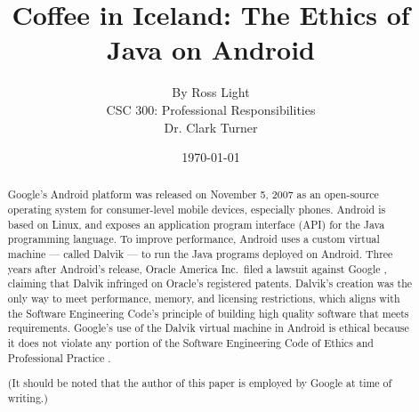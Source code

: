 \documentclass[11pt]{article}
\begin{document}
\title{\vfill Coffee in Iceland: The Ethics of Java on Android} %
\author{
By Ross Light \vspace{10pt} \\
CSC 300: Professional Responsibilities  \vspace{10pt} \\
Dr. Clark Turner \vspace{10pt} \\
}
\date{\today} %

\maketitle

\vfill  %
\begin{abstract} %

Google's Android platform was released on November 5, 2007
\cite{open-handset-alliance-ann} as an open-source operating system for
consumer-level mobile devices, especially phones.  Android is based on Linux,
and exposes an application program interface (API) for the Java programming
language.  To improve performance, Android uses a custom virtual machine ---
called Dalvik --- to run the Java programs deployed on Android.  Three years
after Android's release, Oracle America Inc.~filed a lawsuit against Google
\cite{oracle-lawsuit}, claiming that Dalvik infringed on Oracle's registered
patents.  Dalvik's creation was the only way to meet performance, memory, and
licensing restrictions, which aligns with the Software Engineering Code's
principle of building high quality software that meets requirements.  Google's
use of the Dalvik virtual machine in Android is ethical because it does not
violate any portion of the Software Engineering Code of Ethics and Professional
Practice \cite{secode}.  

(It should be noted that the author of this paper is employed by Google at
time of writing.)
\end{abstract} %

\thispagestyle{empty} %
\newpage

\thispagestyle{empty}  %
\tableofcontents
\end{document}

